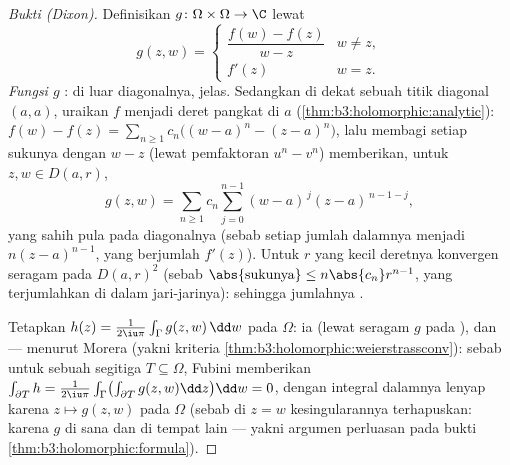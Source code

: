\begin{proof}[Bukti (Dixon)]
Definisikan $g \colon \Omega\times\Omega \to \C$ lewat
\[
g(z, w) = \begin{cases}
\dfrac{f(w) - f(z)}{w - z} & w \neq z,\\[4pt]
f'(z) & w = z .
\end{cases}
\]
\emph{Fungsi $g$ }: di luar diagonalnya, jelas. Sedangkan di dekat sebuah
titik diagonal $(a, a)$, uraikan $f$ menjadi deret pangkat di $a$
(\cref{thm:b3:holomorphic:analytic}): $f(w) - f(z) =
\sum_{n\geq1}c_n\bigl((w-a)^n - (z-a)^n\bigr)$, lalu membagi
setiap sukunya dengan $w - z$ (lewat pemfaktoran $u^n - v^n$) memberikan, untuk
$z, w \in D(a, r)$,
\[
g(z, w) =
\sum_{n\geq1}c_n\sum_{j=0}^{n-1}(w-a)^{\,j}(z-a)^{\,n-1-j},
\]
yang sahih pula pada diagonalnya (sebab setiap jumlah dalamnya menjadi
$n(z-a)^{n-1}$, yang berjumlah $f'(z)$). Untuk $r$ yang kecil deretnya
konvergen seragam pada $D(a,r)^2$
(sebab $\abs{\text{sukunya}} \leq n\abs{c_n}r^{n-1}$, yang terjumlahkan di dalam
jari-jarinya): sehingga jumlahnya .

Tetapkan $h(z) = \frac1{2\iu\pi}\int_\Gamma g(z, w)\,\dd w$ pada
$\Omega$: ia  (lewat  seragam $g$ pada ),
dan  --- menurut Morera
(yakni kriteria \cref{thm:b3:holomorphic:weierstrassconv}): sebab untuk sebuah
segitiga $T \subseteq \Omega$, Fubini memberikan $\int_{\partial
T}h = \frac1{2\iu\pi}\int_\Gamma\bigl(\int_{\partial T}g(z,
w)\dd z\bigr)\dd w = 0$, dengan integral dalamnya lenyap karena
$z \mapsto g(z, w)$  pada $\Omega$ (sebab di $z = w$
kesingularannya terhapuskan: karena $g$  di sana dan
 di tempat lain --- yakni argumen perluasan pada
bukti \cref{thm:b3:holomorphic:formula}).


\end{proof}
